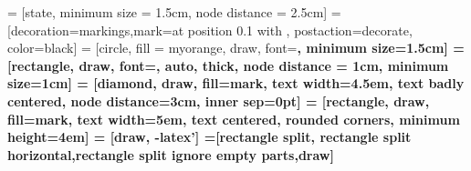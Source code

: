 

\usepackage{caption}
\captionsetup{margin=10pt,font=small,labelfont=bf}

\usepackage{courier}

\usepackage{pgf} 

\usepackage[a4paper]{geometry}

\usepackage{rotating}

\usepackage{setspace} \doublespacing

\renewcommand{\baselinestretch}{1.25}\normalsize
\renewcommand{\arraystretch}{1.0}



\newcommand{\header}[3]
{\setlength{\parindent}{0pt}
\hfill\today\\
#1\\[18pt]
\begin{large}\textbf{#2}\end{large}\\[9pt]
\begin{huge}\textbf{#3}\end{huge}\\
\rule{1\textwidth}{0.3pt}\\[6pt]}









\usepackage{tikz}
\usetikzlibrary{decorations.markings,arrows} 
\usetikzlibrary{shapes,positioning,shadows,arrows,automata}
 = [state, minimum size = 1.5cm, node distance = 2.5cm]
 = [decoration={markings,mark=at position 0.1 with }, postaction=decorate, color=black] 
 = [circle, fill = myorange, draw, font=\sffamily\bfseries, minimum size=1.5cm]
 = [rectangle, draw, font=\sffamily\bfseries, auto, thick, node distance = 1cm, minimum size=1cm]
 = [diamond, draw, fill=mark, text width=4.5em, text badly centered, node distance=3cm, inner sep=0pt]
 = [rectangle, draw, fill=mark, text width=5em, text centered, rounded corners, minimum height=4em]
 = [draw, -latex'] 
=[rectangle split, rectangle split horizontal,rectangle split ignore empty parts,draw]


